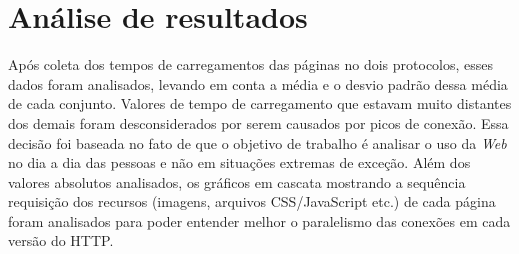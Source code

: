 \section{Análise de resultados}
\label{sec:analisederesultados}

Após coleta dos tempos de carregamentos das páginas no dois protocolos, esses dados foram analisados, levando em conta a média e o desvio padrão dessa média de cada conjunto. Valores de tempo de carregamento que estavam muito distantes dos demais foram desconsiderados por serem causados por picos de conexão. Essa decisão foi baseada no fato de que o objetivo de trabalho é analisar o uso da \textit{Web} no dia a dia das pessoas e não em situações extremas  de exceção. Além dos valores absolutos analisados, os gráficos em cascata mostrando a sequência requisição dos recursos (imagens, arquivos CSS/JavaScript etc.) de cada página foram analisados para poder entender melhor o paralelismo das conexões em cada versão do HTTP.